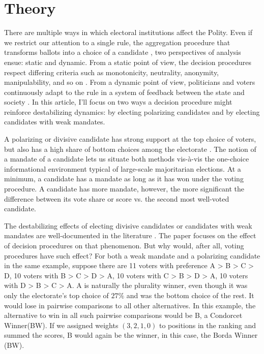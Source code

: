 \documentclass[hidelinks,11pt]{article}
\begin{document}
\section{Theory}
There are multiple ways in which electoral institutions affect the Polity. Even if we restrict our attention to a single rule, the aggregation procedure that transforms ballots into a choice of a candidate \parencite{Goodin_2006}, two perspectives of analysis ensue: static and dynamic. From a static point of view, the decision procedures respect differing criteria such as monotonicity, neutrality, anonymity, manipulability, and so on \parencite{nurmi1999voting}. From a dynamic point of view, politicians and voters continuously adapt to the rule in a system of feedback between the state and society \parencite{Wange2021systems}. In this article, I'll focus on two ways a decision procedure might reinforce destabilizing dynamics: by electing polarizing candidates and by electing candidates with weak mandates.


A polarizing or divisive candidate has strong support at the top
choice of voters, but also has a high share of bottom choices among the
electorate \parencite{igersheim22_compar_votin_method}.
The notion of a mandate of a candidate lets us situate both methods vis-{\`a}-vis
the one-choice informational environment typical of large-scale majoritarian
elections. At a minimum, a candidate has a mandate as long as it has won
under the voting procedure. A candidate has more mandate, however, the more significant
the difference between its vote share or score vs. the second most well-voted
candidate.

The destabilizing effects of electing divisive candidates or candidates with weak mandates are well-documented in the literature \parencite{kaminski2015empirical, luhrmann2018democracy, Baldassarrie2116863118, Bednare2113843118}. The paper focuses on the effect of decision procedures on that phenomenon. But why would, after all, voting procedures have such effect? For both a weak mandate and a polarizing candidate in the same example, suppose there are 11 voters with preference A > B > C > D, 10 voters with B > C > D > A, 10 voters with  C > B > D > A, 10 voters with D > B > C > A. A is naturally the plurality winner, even though it was only the electorate's top choice of \(27\%\) and was the bottom choice of the rest. It would lose in pairwise comparisons to all other alternatives. In this example, the alternative to win in all such pairwise comparisons would be B, a Condorcet Winner(BW). If we assigned weights \((3,2,1,0)\) to positions in the ranking and summed the scores, B would again be the winner, in this case, the Borda Winner (BW).
\end{document}

